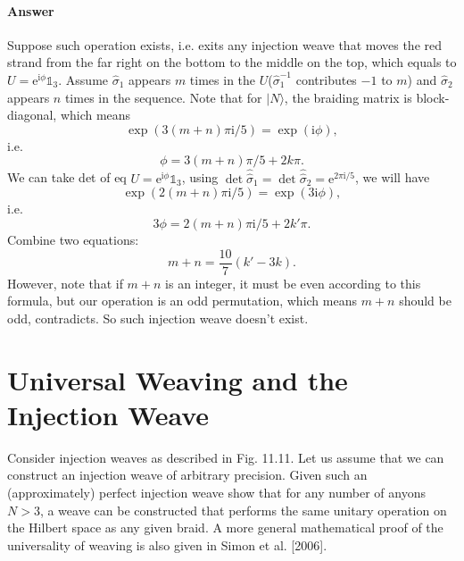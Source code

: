 \paragraph{Answer}
Suppose such operation exists, i.e. exits any injection weave that moves the red strand from the far right on the bottom to the middle on the top, which equals to $U=\mathrm{e}^{\mathrm{i} \phi }\mathds{1}_{3}$. Assume $\hat{\sigma }_{1}$ appears $m$ times in the $U$($\hat{\sigma }_{1}^{-1}$ contributes $-1$ to $m$) and $\hat{\sigma }_{2}$ appears $n$ times in the sequence. Note that for $|N \rangle $, the braiding matrix is block-diagonal, which means
\begin{equation*}
\exp( 3( m+n) \pi \mathrm{i} /5) =\exp(\mathrm{i} \phi ) ,
\end{equation*}
i.e.
\begin{equation*}
\phi =3( m+n) \pi /5+2k\pi .
\end{equation*}
We can take det of eq $U=\mathrm{e}^{\mathrm{i} \phi }\mathds{1}_{3}$, using $\det\hat{\hat{\sigma }}_{1} =\det\hat{\hat{\sigma }}_{2} =\mathrm{e}^{2\pi \mathrm{i} /5}$, we will have
\begin{equation*}
\exp( 2( m+n) \pi \mathrm{i} /5) =\exp( 3\mathrm{i} \phi ) ,
\end{equation*}
i.e.
\begin{equation*}
3\phi =2( m+n) \pi \mathrm{i} /5+2k'\pi .
\end{equation*}
Combine two equations:
\begin{equation*}
m+n=\frac{10}{7}( k'-3k) .
\end{equation*}
However, note that if $m+n$ is an integer, it must be even according to this formula, but our operation is an odd permutation, which means $m+n$ should be odd, contradicts. So such injection weave doesn't exist. 

\section{Universal Weaving and the Injection Weave}
Consider injection weaves as described in Fig. 11.11. Let us assume that we can construct an injection weave of arbitrary precision. Given such an (approximately) perfect injection weave show that for any number of anyons $N >3$, a weave can be constructed that performs the same unitary operation on the Hilbert space as any given braid. A more general mathematical proof of the universality of weaving is also given in Simon et al. [2006].


